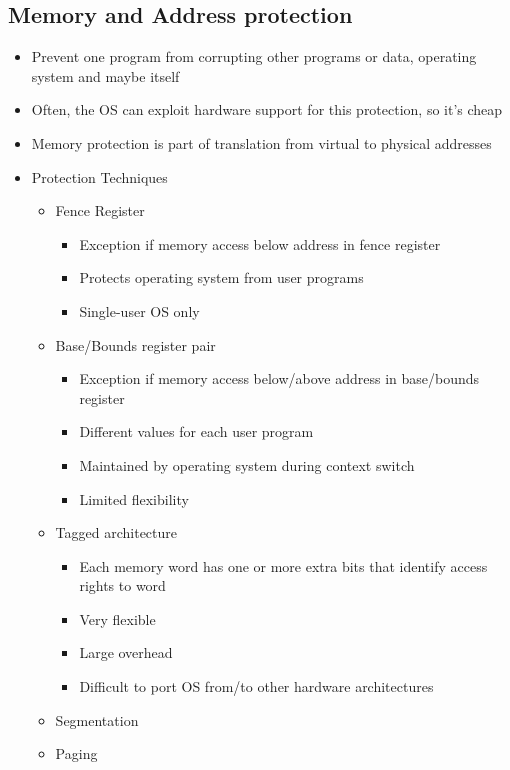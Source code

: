 \documentclass[twoside]{article}
\begin{document}
\subsection{Memory and Address protection}
\begin{itemize}
\item Prevent one program from corrupting other programs or data, operating system and maybe itself
\item Often, the OS can exploit hardware support for this protection, so it’s cheap
\item Memory protection is part of translation from virtual to physical addresses
\item Protection Techniques
\begin{itemize}
\item Fence Register 
\begin{itemize}
\item Exception if memory access below address in fence
register
\item Protects operating system from user programs
\item Single-user OS only
\end{itemize}
\item Base/Bounds register pair
\begin{itemize}
\item Exception if memory access below/above address in
base/bounds register
\item Different values for each user program
\item Maintained by operating system during context switch
\item Limited flexibility
\end{itemize}
\item Tagged architecture
\begin{itemize}
\item Each memory word has one or more extra bits that
identify access rights to word
\item Very flexible
\item Large overhead
\item Difficult to port OS from/to other hardware
architectures
\end{itemize}
\item Segmentation 
\item Paging
\end{itemize}
\end{itemize}
\end{document}
